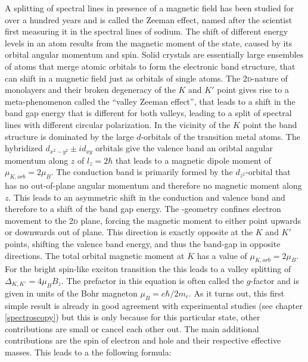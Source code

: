 A splitting of spectral lines in presence of a magnetic field has been studied for over a hundred years and is called the Zeeman effect, named after the scientist first measuring it in the spectral lines of sodium. The shift of different energy levels in an atom results from the magnetic moment of the state, caused by its orbital angular momentum and spin. Solid crystals are essentially large ensembles of atoms that merge atomic orbitals to form the electronic band structure, that can shift in a magnetic field just as orbitals of single atoms. The 2\textsc{d}-nature of \tmdg monolayers and their broken degeneracy of the $K$ and $K'$ point gives rise to a meta-phenomenon called the ``valley Zeeman effect'', that leads to a shift in the band gap energy that is different for both valleys, leading to a split of spectral lines with different circular polarization\cite{srivastava_valley_2015, aivazian_magnetic_2015}. In the vicinity of the $K$ point the band structure is dominated by the large $d$-orbitals of the transition metal atoms. The hybridized $d_{x^2-y^2} \pm id_{xy}$ orbitals give the valence band an oribtal angular momentum along $z$ of $l_z=2\hbar$ that leads to a magnetic dipole moment of $\mu_{K,orb}=2\mu_B$. The conduction band is primarily formed by the $d_{z^2}$-orbital that has no out-of-plane angular momentum and therefore no magnetic moment along $z$. This leads to an asymmetric shift in the conduction and valence band and therefore to a shift of the band gap energy. The \tmd-geometry confines electron movement to the 2\textsc{d} plane, forcing the magnetic moment to either point upwards or downwards out of plane. This direction is exactly opposite at the $K$ and $K'$ points, shifting the valence band energy, and thus the band-gap in opposite directions. The total orbital magnetic moment at $K$ has a value of $\mu_{K,orb}=2\mu_B$. For the bright spin-like exciton transition the this leads to a valley splitting of $\Delta_{K,K'}=4\mu_BB_z$. The prefactor in this equation is often called the $g$-factor and is given in units of the Bohr magneton $\mu_B=e\hbar/2m_e$. As it turns out, this first simple result is already in good agreement with experimental studies (see chapter \ref{spectroscopy}) but this is only because for this particular state, other contributions are small or cancel each other out. The main additional contributions are the spin of electron and hole and their respective effective masses. %
This leads to a the following formula:

